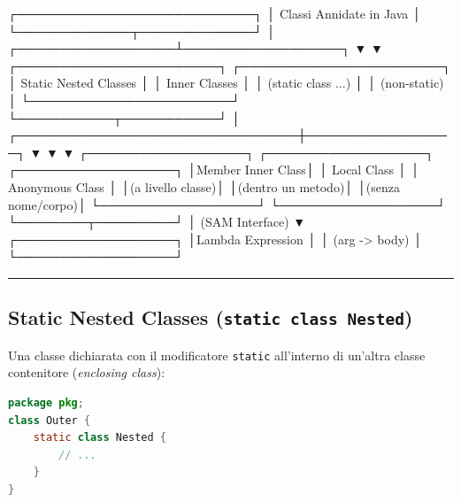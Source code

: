 \documentclass[11pt,a4paper,oneside]{report}
\newcommand{\passthrough}[1]{#1}
\begin{document}
\needspace{7cm}
\begin{asciibox}
                 ┌───────────────────────────┐
                 │  Classi Annidate in Java  │
                 └─────────────┬─────────────┘
                               │
            ┌──────────────────┴──────────────────┐
            ▼                                     ▼
 ┌───────────────────────┐             ┌───────────────────────┐
 │ Static Nested Classes │             │     Inner Classes     │
 │   (static class ...)  │             │     (non-static)      │
 └───────────────────────┘             └───────────┬───────────┘
                                                   │
                  ┌────────────────────────────────┼─────────────────┐
                  ▼                                ▼                 ▼
       ┌──────────────────┐ ┌──────────────────┐ ┌──────────────────┐
       │Member Inner Class│ │   Local Class    │ │ Anonymous Class  │
       │(a livello classe)│ │(dentro un metodo)│ │(senza nome/corpo)│
       └──────────────────┘ └──────────────────┘ └────────┬─────────┘
                                                           │ (SAM Interface)
                                                           ▼
                                                 ┌──────────────────┐
                                                 │Lambda Expression │
                                                 │  (arg -> body)   │
                                                 └──────────────────┘
\end{asciibox}

\begin{center}\rule{0.5\linewidth}{0.5pt}\end{center}

\subsection{\texorpdfstring{Static Nested Classes
(\texttt{static\ class\ Nested})}{Static Nested Classes (static class Nested)}}\label{chap13_static-nested-classes-static-class-nested}

Una classe dichiarata con il modificatore
\passthrough{\lstinline!static!} all'interno di un'altra classe
contenitore (\emph{enclosing class}):

\begin{lstlisting}[language=Java]
package pkg;
class Outer {
    static class Nested {
        // ...
    }
}
\end{lstlisting}
\end{document}

